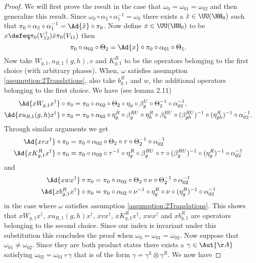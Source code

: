 \begin{proof}
	We will first prove the result in the case that $\omega_0=\omega_{01}=\omega_{02}$ and then generalize this result. Since $\omega_0\circ\alpha_2\circ\alpha_1^{-1}=\omega_0$ there exists a $\tilde{x}\in\UU(\HH_0)$ such that $\pi_0\circ\alpha_2\circ\alpha_1^{-1}=\Ad{\tilde{x}}\circ\pi_0$. Now define $x\in\UU(\HH_0)$ to be $x\defeq \pi_0(V_{12}^\dagger)\tilde{x} \pi_0(V_{11})$ then
	\begin{equation}
		\pi_0\circ\alpha_{02}\circ\Theta_2=\Ad{x}\circ\pi_0\circ\alpha_{01}\circ\Theta_1.
	\end{equation}
	Now take $W_{g,1},u_{R,1}(g,h), v$ and $K^R_{g,1}$ to be the operators belonging to the first choice (with arbitrary phases). When, $\omega$ satisfies assumption \ref{assumption:2Translations}, also take $b^R_{g,1}$ and $w$, the additional operators belonging to the first choice.
	We have (see \cite{Ogata2d} lemma 2.11)
	\begin{align}
		\Ad{xW_{g,1}x^\dagger}\circ\pi_0&=\pi_0\circ \alpha_{02}\circ\Theta_2\circ\eta_g\circ\beta_g^U\circ\Theta_2^{-1}\circ\alpha_{02}^{-1},\\
		\nonumber
		\Ad{xu_{R,1}(g,h)x^\dagger}\circ\pi_0&=\pi_0\circ \alpha_{02}\circ\eta_g^R\circ\beta_g^{RU}\circ\eta_h^R\circ\beta_{h}^{RU}\circ(\beta_{gh}^{RU})^{-1}\circ(\eta_{gh}^R)^{-1}\circ\alpha_{02}^{-1}.
	\end{align}
	Through similar arguments we get
	\begin{align}
		\Ad{xvx^\dagger}\circ\pi_0&=\pi_0\circ\alpha_{02}\circ\Theta_2\circ\tau\circ\Theta_2^{-1}\circ\alpha_{02}^{-1}\\
		\nonumber
		\Ad{xK^R_{g,1}x^\dagger}\circ\pi_0&=\pi_0\circ \alpha_{02}\circ\tau^{-1}\circ\eta_g^R\circ\beta_g^{RU}\circ\tau\circ(\beta_g^{RU})^{-1}\circ(\eta^R_g)^{-1}\circ\alpha_{02}^{-1}
	\end{align}
	and
	\begin{align}
		\Ad{xwx^\dagger}\circ\pi_0&=\pi_0\circ\alpha_{02}\circ\Theta_2\circ\nu\circ\Theta_2^{-1}\circ\alpha_{02}^{-1}\\
		\nonumber
		\Ad{xb^R_{g,1}x^\dagger}\circ\pi_0&=\pi_0\circ \alpha_{02}\circ\nu^{-1}\circ\eta_g^R\circ\nu\circ(\eta_g^R)^{-1}\circ\alpha_{02}^{-1}
	\end{align}
	in the case where $\omega$ satisfies assumption \ref{assumption:2Translations}. This shows that $xW_{g,1}x^\dagger$, $xu_{R,1}(g,h)x^\dagger$, $xvx^\dagger$, $xK^R_{g,1}x^\dagger$, $xwx^\dagger$ and $x b^R_{g,1}$ are operators belonging to the second choice. Since our index is invariant under this substitution this concludes the proof when $\omega_0=\omega_{01}=\omega_{02}$. Now suppose that $\omega_{01}\neq\omega_{02}$. Since they are both product states there exists a $\gamma\in\Aut{\AA}$ satisfying $\omega_{02}=\omega_{01}\circ\gamma$ that is of the form $\gamma=\gamma^L\otimes\gamma^R$. We now have

\end{proof}
